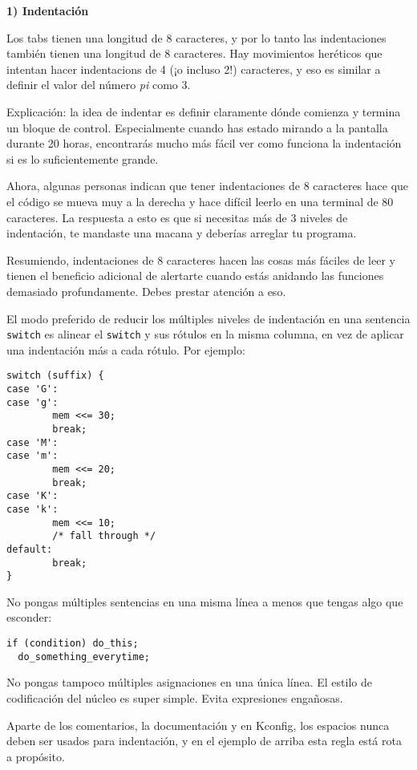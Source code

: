 \textbf{1) Indentación}

Los tabs tienen una longitud de 8 caracteres, y por lo tanto las indentaciones también tienen una longitud de 8 caracteres. Hay movimientos heréticos que intentan hacer indentacions de 4 (¡o incluso 2!) caracteres, y eso es similar a definir el valor del número \emph{pi} como 3.

Explicación: la idea de indentar es definir claramente dónde comienza y termina un bloque de control. Especialmente cuando has estado mirando a la pantalla durante 20 horas, encontrarás mucho más fácil ver como funciona la indentación si es lo suficientemente grande.

Ahora, algunas personas indican que tener indentaciones de 8 caracteres hace que el código se mueva muy a la derecha y hace difícil leerlo en una terminal de 80 caracteres. La respuesta a esto es que si necesitas más de 3 niveles de indentación, te mandaste una macana y deberías arreglar tu programa.

Resumiendo, indentaciones de 8 caracteres hacen las cosas más fáciles de leer y tienen el beneficio adicional de alertarte cuando estás anidando las funciones demasiado profundamente. Debes prestar atención a eso.

El modo preferido de reducir los múltiples niveles de indentación en una sentencia \texttt{switch} es alinear el \texttt{switch} y sus rótulos en la misma columna, en vez de aplicar una indentación más a cada rótulo. Por ejemplo:

\begin{verbatim}
switch (suffix) {
case 'G':
case 'g':
        mem <<= 30;
        break;
case 'M':
case 'm':
        mem <<= 20;
        break;
case 'K':
case 'k':
        mem <<= 10;
        /* fall through */
default:
        break;
}
\end{verbatim}

No pongas múltiples sentencias en una misma línea a menos que tengas algo que esconder:

\begin{verbatim}
if (condition) do_this;
  do_something_everytime;
\end{verbatim}

No pongas tampoco múltiples asignaciones en una única línea. El estilo de codificación del núcleo es super simple. Evita expresiones engañosas.

Aparte de los comentarios, la documentación y en Kconfig, los espacios nunca deben ser usados para indentación, y en el ejemplo de arriba esta regla está rota a propósito.

